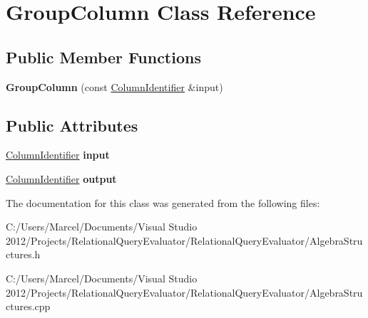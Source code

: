 \hypertarget{class_group_column}{\section{Group\+Column Class Reference}
\label{class_group_column}
}
\subsection*{Public Member Functions}
\begin{DoxyCompactItemize}
\item 
\hypertarget{class_group_column_a6b48cfe01058e5c5a06e2882d329b5ca}{{\bfseries Group\+Column} (const \hyperlink{class_column_identifier}{Column\+Identifier} \&input)}\label{class_group_column_a6b48cfe01058e5c5a06e2882d329b5ca}

\end{DoxyCompactItemize}
\subsection*{Public Attributes}
\begin{DoxyCompactItemize}
\item 
\hypertarget{class_group_column_a2bcc2e12a33f7a9b47633f2b87ebc68b}{\hyperlink{class_column_identifier}{Column\+Identifier} {\bfseries input}}\label{class_group_column_a2bcc2e12a33f7a9b47633f2b87ebc68b}

\item 
\hypertarget{class_group_column_a512e089dfed68312aeadfcbdd1b80a21}{\hyperlink{class_column_identifier}{Column\+Identifier} {\bfseries output}}\label{class_group_column_a512e089dfed68312aeadfcbdd1b80a21}

\end{DoxyCompactItemize}


The documentation for this class was generated from the following files\+:\begin{DoxyCompactItemize}
\item 
C\+:/\+Users/\+Marcel/\+Documents/\+Visual Studio 2012/\+Projects/\+Relational\+Query\+Evaluator/\+Relational\+Query\+Evaluator/Algebra\+Structures.\+h\item 
C\+:/\+Users/\+Marcel/\+Documents/\+Visual Studio 2012/\+Projects/\+Relational\+Query\+Evaluator/\+Relational\+Query\+Evaluator/Algebra\+Structures.\+cpp\end{DoxyCompactItemize}
